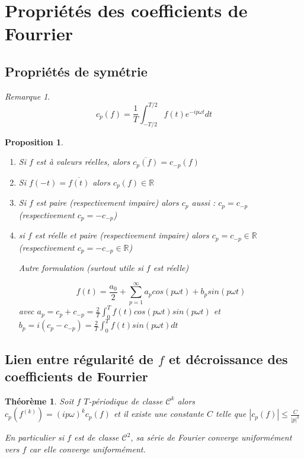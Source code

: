 \documentclass[]{article}
\newtheorem{mythm}{Théorème}
\newtheorem{myproposition}{Proposition}
\theoremstyle{remark}
\newtheorem{myrem}{Remarque}
\theoremstyle{definition}
\begin{document}
\section{Propriétés des coefficients de Fourrier}

\subsection{Propriétés de symétrie}

\begin{myrem}
	$$c_p(f) = \frac{1}{T} \int_{-T/2}^{T/2} f(t) e^{-i p \omega t} dt$$
\end{myrem}

\begin{myproposition}
	\begin{enumerate}
	\leavevmode
		\item Si $f$ est à valeurs réelles, alors $\overline{c_p(f)} = c_{-p}(f)$
		\item Si $f(-t) = \overline{f(t)}$ alors $c_p(f) \in \mathbb{R}$
		\item Si $f$ est paire (respectivement impaire) alors $c_p$ aussi : $c_p = c_{-p}$ (respectivement $c_p = -c_{-p}$)
		
		\item si $f$ est réelle et paire (respectivement impaire) alors $c_p = c_{-p} \in \mathbb{R}$ (respectivement $c_p = - c_{-p} \in \mathbb{R}$)
		
		Autre formulation (surtout utile si $f$ est réelle)
		
		$$f(t) = \frac{a_0}{2} + \sum_{p = 1}^{\infty} a_p cos(p \omega t) + b_p sin(p \omega t)$$
		avec $a_p = c_p + c_{-p} = \frac{2}{T} \int_{0}^{T} f(t) cos (p \omega t) sin (p \omega t)$ et $b_p = i(c_p - c_{-p}) = \frac{2}{T} \int_{0}^{T} f(t) sin(p \omega t) dt$
	\end{enumerate}
\end{myproposition}

\subsection{Lien entre régularité de $f$ et décroissance des coefficients de Fourrier}

\begin{mythm}
	Soit $f$ $T$-périodique de classe $\mathcal{C}^k$ alors $c_p(f^(k)) = (i p \omega)^k c_p(f)$ et il existe une constante $C$ telle que $\displaystyle |c_p(f)| \leqslant \frac{C}{|p|^k}$
	
	En particulier  si $f$ est de classe $\mathcal{C}^2$, sa série de Fourier converge uniformément vers $f$ car elle converge uniformément.
\end{mythm}
\end{document}
